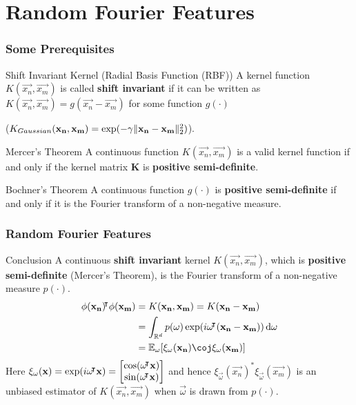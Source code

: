 \documentclass[10pt]{../formats/RU}
\begin{document}
\section{Random Fourier Features}
\begin{frame}
\frametitle{Some Prerequisites}
\begin{alertblock}{Shift Invariant Kernel (Radial Basis Function (RBF))}
  A kernel function $K(\vec{x_n}, \vec{x_m})$ is called \textbf{shift invariant} if it can be written as $K(\vec{x_n}, \vec{x_m}) = g(\vec{x_n}-\vec{x_m})$ for some function $g(\cdot)$

  (\eg $K_{Gaussian}(\mathbf{x_n},\mathbf{x_m})=\exp(-\gamma\lVert\mathbf{x_n}-\mathbf{x_m}\rVert_2^2)$).
\end{alertblock}
\begin{block}{Mercer’s Theorem}
  A continuous function $K(\vec{x_n}, \vec{x_m})$ is a valid kernel function if and only if the kernel matrix $\mathbf{K}$ is \textbf{positive semi-definite}.
\end{block}
\begin{block}{Bochner's Theorem}
  A continuous function $g(\cdot)$ is \textbf{positive semi-definite} if and only if it is the Fourier transform of a non-negative measure.
\end{block}
\end{frame}
\begin{frame}
  \frametitle{Random Fourier Features}
  \begin{exampleblock}{Conclusion}
    A continuous \textbf{shift invariant} kernel $K(\vec{x_n}, \vec{x_m})$, which is \textbf{positive semi-definite} (Mercer's Theorem), is the Fourier transform of a non-negative measure $p(\cdot)$.
    \begin{align}
      \phi(\vec{x_n})\trn\phi(\vec{x_m})
      &= K(\vec{x_n}, \vec{x_m}) = K(\vec{x_n}-\vec{x_m}) \\
      &=\int_{\R^d}p(\vec{\omega})\exp(i\vec{\omega}\trn(\vec{x_n}-\vec{x_m}))\diff\vec{\omega} \\
      &= \mathbb{E}_{\vec{\omega}}\bracks*{\xi_{\vec{\omega}}(\vec{x_n})\coj\xi_{\vec{\omega}}(\vec{x_m})}\label{rffinC}
    \end{align}
    Here
    $
    \xi_{\mathbf{\omega}}(\mathbf{x})=\exp(i\mathbf{\omega}{}^{\mkern-4mu\intercal}\mathbf{x})
    ={
      \begin{bmatrix}
        \cos(\mathbf{\omega}{}^{\mkern-4mu\intercal}\mathbf{x}) \\
        \sin(\mathbf{\omega}{}^{\mkern-4mu\intercal}\mathbf{x})
      \end{bmatrix}
    }
    $
    and hence $\xi_{\vec{\omega}}(\vec{x_n})^*\xi_{\vec{\omega}}(\vec{x_m})$ is an unbiased estimator of $K(\vec{x_n}, \vec{x_m})$ when $\vec{\omega}$ is drawn from $p(\cdot)$.
  \end{exampleblock}
\end{frame}
\end{document}
